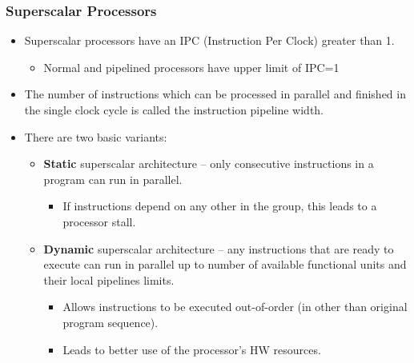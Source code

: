 \documentclass[aspectratio=169]{beamer}
\begin{document}
\begin{frame}
\frametitle{Superscalar Processors}

\begin{itemize}
\item Superscalar processors have an IPC (Instruction Per Clock) greater than 1.
  \begin{itemize}
  \item Normal and pipelined processors have upper limit of IPC=1
  \end{itemize}
\item The number of instructions which can be processed in parallel and finished in the single clock cycle is called the instruction pipeline width.
\item There are two basic variants:
  \begin{itemize}
  \item \textbf{Static} superscalar architecture -- only consecutive instructions in a program can run in parallel.
    \begin{itemize}
    \item If instructions depend on any other in the group, this leads to a processor stall.
    \end{itemize}
  \item \textbf{Dynamic} superscalar architecture -- any instructions that are ready to execute can run in parallel up to number of available functional units and their local pipelines limits.
    \begin{itemize}
    \item Allows instructions to be executed out-of-order (in other than original program sequence).
    \item Leads to better use of the processor's HW resources.
    \end{itemize}
  \end{itemize}
\end{itemize}

\end{frame}
\end{document}
